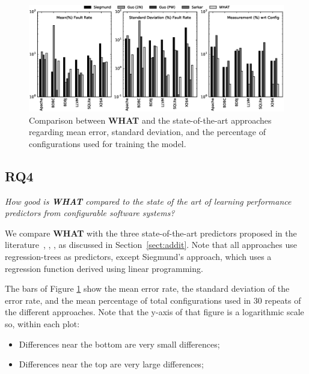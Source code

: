 \documentclass{newsig}
\newcommand{\what}{{\bf WHAT }}
\begin{document}
\begin{figure}[tbh]
\includegraphics[width=\linewidth]{Figures/compare_graph_h}
\caption{Comparison between \what and the state-of-the-art approaches regarding mean error, standard deviation, and the percentage of configurations used for training the model.} \label{fig:Comparison}
\end{figure}
 
 \newpage
\subsection{RQ4}



 \begin{center}
{\em How good is \what compared to the state of the art of learning performance predictors from configurable software systems?}
\end{center}

We compare \what with the three state-of-the-art predictors proposed in the literature~\cite{siegmund2012predicting}, \cite{guo2013variability}, \cite{sarkar2015cost}, as discussed in Section~\ref{sect:addit}. Note that all approaches use regression-trees as predictors, except Siegmund's approach, which uses a regression function derived using linear programming.
 
 The  bars of Figure \ref{fig:Comparison} show the
 mean error rate, the standard deviation of the error rate, and the mean percentage
 of total configurations used in 30 repeats of the different approaches.
 Note that the y-axis of that figure is a logarithmic scale so, within each plot:
 \begin{itemize}
 \item Differences near the bottom  are very small differences;
 \item Differences near the top   are very large differences;
 \end{itemize}
 
\end{document}
